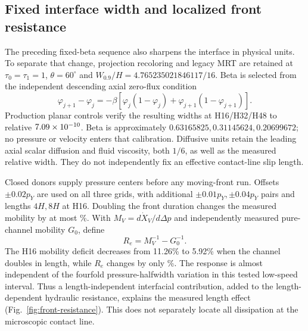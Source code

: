 \subsection{Fixed interface width and localized front resistance}
The preceding fixed-beta sequence also sharpens the interface in physical
units. To separate that change, projection recoloring and legacy MRT are
retained at $\tau_0=\tau_1=1$, $\theta=60^\circ$ and
$W_{0.9}/H=4.765235021846117/16$. Beta is selected from the independent
descending axial zero-flux condition
\begin{equation}
 \varphi_{j+1}-\varphi_j=-\beta[
 \varphi_j(1-\varphi_j)+\varphi_{j+1}(1-\varphi_{j+1})].
\end{equation}
Production planar controls verify the resulting widths at H16/H32/H48
to relative $7.09\times10^{-10}$. Beta is approximately
$0.63165825,0.31145624,0.20699672$; no pressure or velocity enters that
calibration. Diffusive units retain the leading axial scalar diffusion and
fluid viscosity, both $1/6$, as well as the measured relative width.
They do not independently fix an effective contact-line slip length.

Closed donors supply pressure centers before any moving-front run.
Offsets $\pm0.02p_Y$ are used on all three grids, with additional
$\pm0.01p_Y,\pm0.04p_Y$ pairs and lengths $4H,8H$ at H16.
Doubling the front duration changes the measured mobility by at most
\FrontDurationMobilityPercent\%. With $M_V=d\dot X_V/d\Delta p$ and
independently measured pure-channel mobility $G_0$, define
\begin{equation}
 R_e=M_V^{-1}-G_0^{-1}.
 \label{eq:front-resistance}
\end{equation}
The H16 mobility deficit decreases from 11.26\% to 5.92\% when the
channel doubles in length, while $R_e$ changes by only
\FrontLengthResistancePercent\%. The response is almost independent of
the fourfold pressure-halfwidth variation in this tested low-speed interval.
Thus a length-independent interfacial contribution, added to the
length-dependent hydraulic resistance, explains the measured length effect
(Fig.~\ref{fig:front-resistance}). This does not separately locate all
dissipation at the microscopic contact line.

